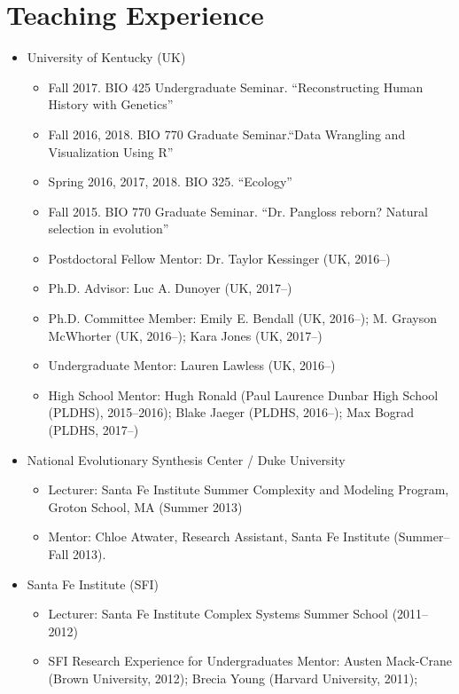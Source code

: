 \documentclass[11pt]{article}
\begin{document}
  \section{Teaching Experience}

  \begin{itemize}
  \item University of Kentucky (UK)
    \begin{itemize}
    \item Fall 2017. BIO 425 Undergraduate Seminar. ``Reconstructing Human History with Genetics''
    \item Fall 2016, 2018. BIO 770 Graduate Seminar.``Data Wrangling and Visualization Using R''
    \item Spring 2016, 2017, 2018. BIO 325. ``Ecology''
    \item Fall 2015. BIO 770 Graduate Seminar. ``Dr. Pangloss reborn? Natural selection in evolution''
    \item Postdoctoral Fellow Mentor: Dr. Taylor Kessinger (UK, 2016--)
    \item Ph.D. Advisor: Luc A. Dunoyer (UK, 2017--)
    \item Ph.D. Committee Member: Emily E. Bendall (UK, 2016--); M. Grayson McWhorter (UK, 2016--); Kara Jones (UK, 2017--)
    \item Undergraduate Mentor: Lauren Lawless (UK, 2016--)
    \item High School Mentor: Hugh Ronald (Paul Laurence Dunbar High School (PLDHS), 2015--2016); Blake Jaeger (PLDHS, 2016--); Max Bograd (PLDHS, 2017--)
    \end{itemize}
  \item National Evolutionary Synthesis Center / Duke University
    \begin{itemize}
    \item Lecturer: Santa Fe Institute Summer Complexity and Modeling Program, \\
      Groton School, MA (Summer 2013)
    \item Mentor: Chloe Atwater, Research Assistant, Santa Fe Institute (Summer--Fall 2013).
    \end{itemize}
  \item Santa Fe Institute (SFI)
    \begin{itemize}
    \item Lecturer: Santa Fe Institute Complex Systems Summer School (2011--2012)
    \item SFI Research Experience for Undergraduates Mentor: Austen Mack-Crane (Brown University, 2012); Brecia Young (Harvard University, 2011); 

\end{itemize}
\end{itemize}
\end{document}

